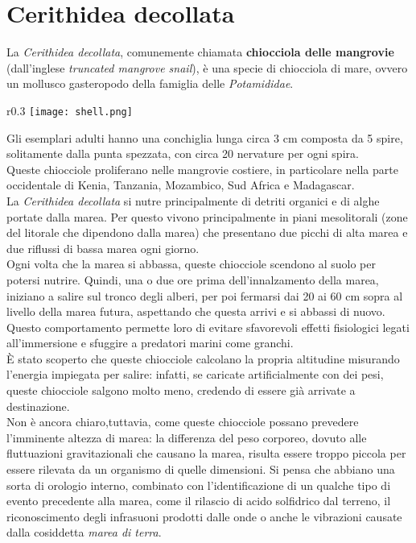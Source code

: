 		\section{Cerithidea decollata}
		
			La \textit{Cerithidea decollata}, comunemente chiamata \textbf{chiocciola delle mangrovie} (dall'inglese \textit{truncated mangrove snail}), è una specie di chiocciola di mare, ovvero un mollusco gasteropodo della famiglia delle \textit{Potamididae}.\\
			\begin{wrapfigure}{r}{0.3\textwidth}
				\centering
				\texttt{[image: shell.png]}
			\end{wrapfigure}
			Gli esemplari adulti hanno una conchiglia lunga circa 3 cm composta da 5 spire, solitamente dalla punta spezzata, con circa 20 nervature per ogni spira.\\
			Queste chiocciole proliferano nelle mangrovie costiere, in particolare nella parte occidentale di Kenia, Tanzania, Mozambico, Sud Africa e Madagascar.\\
			La \textit{Cerithidea decollata} si nutre principalmente di detriti organici e di alghe portate dalla marea. Per questo vivono principalmente in piani mesolitorali (zone del litorale che dipendono dalla marea) che presentano due picchi di alta marea e due riflussi di bassa marea ogni giorno.\\
			Ogni volta che la marea si abbassa, queste chiocciole scendono al suolo per potersi nutrire. Quindi, una o due ore prima dell'innalzamento della marea, iniziano a salire sul tronco degli alberi, per poi fermarsi dai 20 ai 60 cm sopra al livello della marea futura, aspettando che questa arrivi e si abbassi di nuovo.\\
			Questo comportamento permette loro di evitare sfavorevoli effetti fisiologici legati all'immersione e sfuggire a predatori marini come granchi.\\
			È stato scoperto che queste chiocciole calcolano la propria altitudine misurando l'energia impiegata per salire: infatti, se caricate artificialmente con dei pesi, queste chiocciole salgono molto meno, credendo di essere già arrivate a destinazione.\\
			Non è ancora chiaro,tuttavia, come queste chiocciole possano prevedere l'imminente altezza di marea: la differenza del peso corporeo, dovuto alle fluttuazioni gravitazionali che causano la marea, risulta essere troppo piccola per essere rilevata da un organismo di quelle dimensioni. Si pensa che abbiano una sorta di orologio interno, combinato con l'identificazione di un qualche tipo di evento precedente alla marea, come il rilascio di acido solfidrico dal terreno, il riconoscimento degli infrasuoni prodotti dalle onde o anche le vibrazioni causate dalla cosiddetta \textit{marea di terra}.\\
